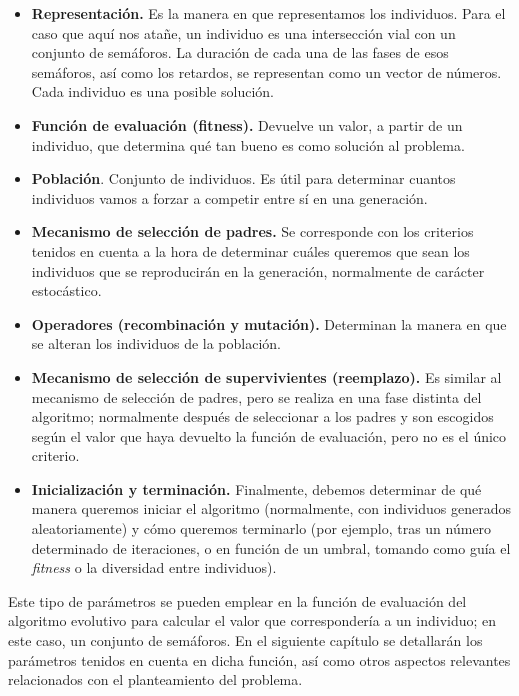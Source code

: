 \begin{itemize}
    \item \textbf{Representación.} Es la manera en que representamos los individuos. Para el caso que aquí nos atañe, un individuo es una intersección vial con un conjunto de semáforos. La duración de cada una de las fases de esos semáforos, así como los retardos, se representan como un vector de números. Cada individuo es una posible solución.
    \item \textbf{Función de evaluación (fitness).} Devuelve un valor, a partir de un individuo, que determina qué tan bueno es como solución al problema.
    \item \textbf{Población}. Conjunto de individuos. Es útil para determinar cuantos individuos vamos a forzar a competir entre sí en una generación.
    \item \textbf{Mecanismo de selección de padres.} Se corresponde con los criterios tenidos en cuenta a la hora de determinar cuáles queremos que sean los individuos que se reproducirán en la generación, normalmente de carácter estocástico.
    \item \textbf{Operadores (recombinación y mutación).} Determinan la manera en que se alteran los individuos de la población.
    \item \textbf{Mecanismo de selección de supervivientes (reemplazo).} Es similar al mecanismo de selección de padres, pero se realiza en una fase distinta del algoritmo; normalmente después de seleccionar a los padres y son escogidos según el valor que haya devuelto la función de evaluación, pero no es el único criterio.
    \item \textbf{Inicialización y terminación.} Finalmente, debemos determinar de qué manera queremos iniciar el algoritmo (normalmente, con individuos generados aleatoriamente) y cómo queremos terminarlo (por ejemplo, tras un número determinado de iteraciones, o en función de un umbral, tomando como guía el \textit{fitness} o la diversidad entre individuos).
\end{itemize}


Este tipo de parámetros se pueden emplear en la función de evaluación del algoritmo evolutivo para calcular el valor que correspondería a un individuo; en este caso, un conjunto de semáforos. En el siguiente capítulo se detallarán los parámetros tenidos en cuenta en dicha función, así como otros aspectos relevantes relacionados con el planteamiento del problema.


